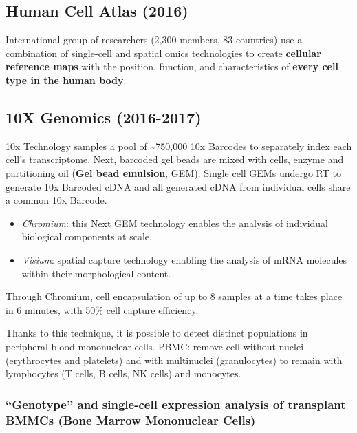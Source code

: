\hypertarget{human-cell-atlas-2016}{%
\subsection{Human Cell Atlas (2016)}\label{human-cell-atlas-2016}}

International group of researchers (2,300 members, 83
countries) use a combination of single-cell and spatial omics
technologies to create \textbf{cellular reference maps} with the
position, function, and characteristics of \textbf{every cell type in
the human body}.

\hypertarget{x-genomics-2016-2017}{%
\subsection{10X Genomics (2016-2017)}\label{x-genomics-2016-2017}}

10x Technology samples a pool of \textasciitilde750,000 10x Barcodes to
separately index each cell's transcriptome. Next, barcoded gel beads are
mixed with cells, enzyme and partitioning oil (\textbf{Gel bead
emulsion}, GEM). Single cell GEMs undergo RT to generate 10x Barcoded
cDNA and all generated cDNA from individual cells share a common 10x
Barcode.

\begin{itemize}
\tightlist
\item
  \emph{Chromium}: this Next GEM technology enables the analysis of
  individual biological components at scale.
\item
  \emph{Visium}: spatial capture technology enabling the analysis of
  mRNA molecules within their morphological content.
\end{itemize}

Through Chromium, cell encapsulation of up to 8 samples at a time takes
place in 6 minutes, with 50\% cell capture efficiency.

Thanks to this technique, it is possible to detect distinct populations
in peripheral blood mononuclear cells. PBMC: remove cell without nuclei (erythrocytes and platelets)
and with multinuclei (granulocytes) to remain with lymphocytes (T cells, B cells, NK cells) and monocytes.

\hypertarget{genotype-and-single-cell-expression-analysis-of-transplant-bmmcs-bone-marrow-mononuclear-cells}{%
\subsubsection{``Genotype'' and single-cell expression analysis of
transplant BMMCs (Bone Marrow Mononuclear
Cells)}\label{genotype-and-single-cell-expression-analysis-of-transplant-bmmcs-bone-marrow-mononuclear-cells}}


